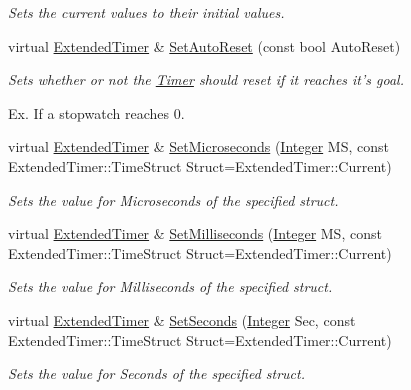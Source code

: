 \begin{DoxyCompactItemize}
\begin{DoxyCompactList}\small\item\em Sets the current values to their initial values. \item\end{DoxyCompactList}\item 
virtual \hyperlink{classphys_1_1ExtendedTimer}{ExtendedTimer} \& \hyperlink{classphys_1_1ExtendedTimer_aa16dfa7e855f9b8b55c85058cb24d03a}{SetAutoReset} (const bool AutoReset)
\begin{DoxyCompactList}\small\item\em Sets whether or not the \hyperlink{classphys_1_1Timer}{Timer} should reset if it reaches it's goal. \par
 Ex. If a stopwatch reaches 0. \item\end{DoxyCompactList}\item 
virtual \hyperlink{classphys_1_1ExtendedTimer}{ExtendedTimer} \& \hyperlink{classphys_1_1ExtendedTimer_a86f1e5d470565a2dda78b66aca47d667}{SetMicroseconds} (\hyperlink{namespacephys_a7f09bf5585b2bb97613cd9aad4273a81}{Integer} MS, const ExtendedTimer::TimeStruct Struct=ExtendedTimer::Current)
\begin{DoxyCompactList}\small\item\em Sets the value for Microseconds of the specified struct. \item\end{DoxyCompactList}\item 
virtual \hyperlink{classphys_1_1ExtendedTimer}{ExtendedTimer} \& \hyperlink{classphys_1_1ExtendedTimer_ab64ddc2dc49d4daf9b0e5a33dc9dc68a}{SetMilliseconds} (\hyperlink{namespacephys_a7f09bf5585b2bb97613cd9aad4273a81}{Integer} MS, const ExtendedTimer::TimeStruct Struct=ExtendedTimer::Current)
\begin{DoxyCompactList}\small\item\em Sets the value for Milliseconds of the specified struct. \item\end{DoxyCompactList}\item 
virtual \hyperlink{classphys_1_1ExtendedTimer}{ExtendedTimer} \& \hyperlink{classphys_1_1ExtendedTimer_ad9303e618cb0ea171441d595eb5a3e55}{SetSeconds} (\hyperlink{namespacephys_a7f09bf5585b2bb97613cd9aad4273a81}{Integer} Sec, const ExtendedTimer::TimeStruct Struct=ExtendedTimer::Current)
\begin{DoxyCompactList}\small\item\em Sets the value for Seconds of the specified struct. \item\end{DoxyCompactList}\item 

\end{DoxyCompactItemize}
